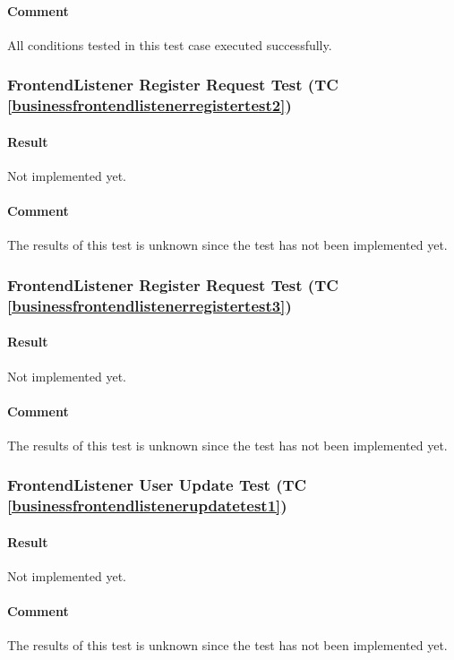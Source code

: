 \documentclass[hidelinks,english]{article}
\begin{document}
				\paragraph{Comment} All conditions tested in this test case executed successfully.
				
			\subsubsection{FrontendListener Register Request Test (TC \ref{businessfrontendlistenerregistertest2})}
				\paragraph{Result} Not implemented yet.
				\paragraph{Comment} The results of this test is unknown since the test has not been implemented yet.
				
			\subsubsection{FrontendListener Register Request Test (TC \ref{businessfrontendlistenerregistertest3})}
				\paragraph{Result} Not implemented yet.
				\paragraph{Comment} The results of this test is unknown since the test has not been implemented yet.
				
			\subsubsection{FrontendListener User Update Test (TC \ref{businessfrontendlistenerupdatetest1})}
				\paragraph{Result} Not implemented yet.
				\paragraph{Comment} The results of this test is unknown since the test has not been implemented yet.
				
\end{document}
